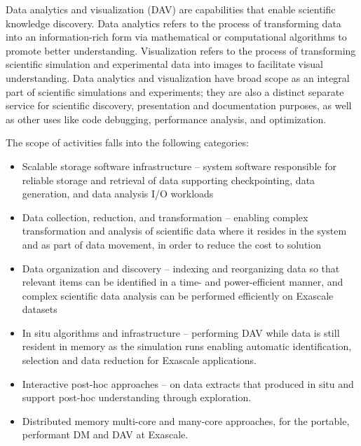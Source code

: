 Data analytics and visualization (DAV) are capabilities that enable scientific knowledge discovery. Data analytics refers to the process of transforming data into an information-rich form via mathematical or computational algorithms to promote better understanding. Visualization refers to the process of transforming scientific simulation and experimental data into images to facilitate visual understanding. Data analytics and visualization have broad scope as an integral part of scientific simulations and experiments; they are also a distinct separate service for scientific discovery, presentation and documentation purposes, as well as other uses like code debugging, performance analysis, and optimization. 

The scope of activities falls into the following categories:
\begin{itemize}
\item Scalable storage software infrastructure – system software responsible for reliable storage and retrieval of data supporting checkpointing, data generation, and data analysis I/O workloads
\item Data collection, reduction, and transformation – enabling complex transformation and analysis of scientific data where it resides in the system and as part of data movement, in order to reduce the cost to solution
\item Data organization and discovery – indexing and reorganizing data so that relevant items can be identified in a time- and power-efficient manner, and complex scientific data analysis can be performed efficiently on Exascale datasets
\item In situ algorithms and infrastructure – performing DAV while data is still resident in memory as the simulation runs enabling automatic identification, selection and data reduction for Exascale applications.
\item Interactive post-hoc approaches – on data extracts that produced in situ and support post-hoc understanding through exploration.
\item Distributed memory multi-core and many-core approaches, for the portable, performant DM and DAV at Exascale.
\end{itemize}
